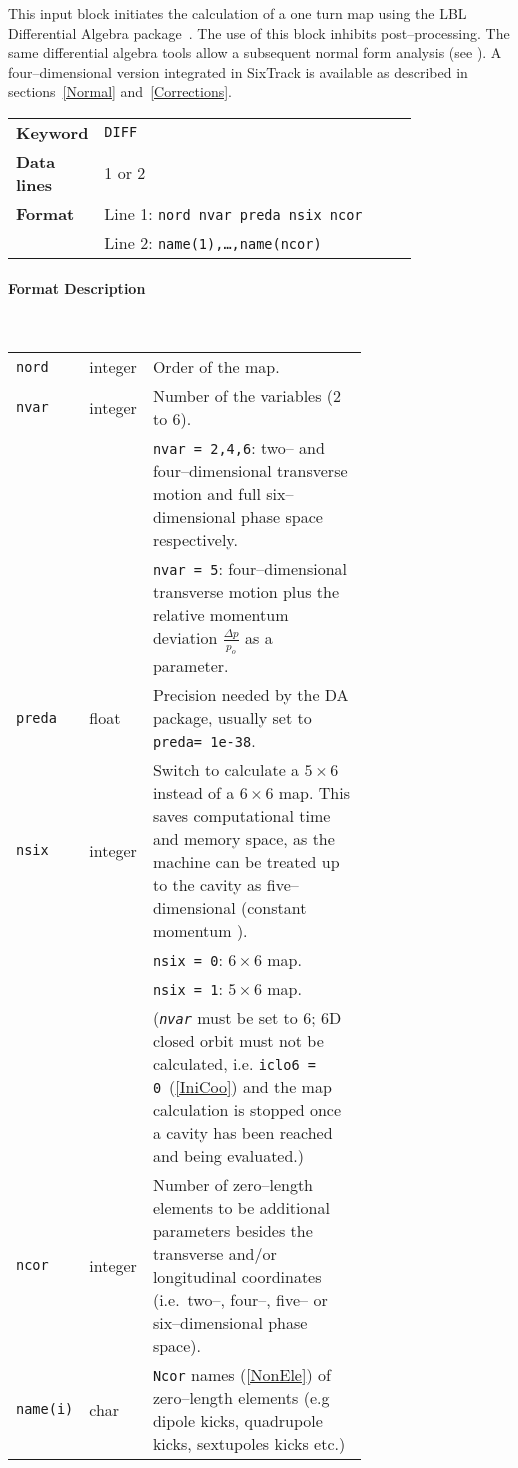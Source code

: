 This input block initiates the calculation of a one turn map using the LBL Differential Algebra package~\cite{DALIE}.
The use of this block inhibits post--processing.
The same differential algebra tools allow a subsequent normal form analysis (see \cite{Forest89}).
A four--dimensional version integrated in SixTrack is available as described in sections~\ref{Normal} and~\ref{Corrections}.

\bigskip
\begin{tabular}{@{}lp{0.8\linewidth}}
    \textbf{Keyword}    & \texttt{DIFF} \\
    \textbf{Data lines} & 1 or 2 \\
    \textbf{Format}     & Line 1: \texttt{nord nvar preda nsix ncor} \\
                        & Line 2: \texttt{name(1),\ldots,name(ncor)}
\end{tabular}

\paragraph{Format Description}~

\bigskip
\begin{longtabu}{@{}llp{0.7\linewidth}}
    \texttt{nord}    & integer & Order of the map. \\
    \texttt{nvar}    & integer & Number of the variables (2 to 6).\\
                     &         & \texttt{nvar = 2,4,6}: two-- and four--dimensional transverse motion and full six--dimensional phase space respectively. \\
                     &         & \texttt{nvar = 5}: four--dimensional transverse motion plus the relative momentum deviation \mbox{$\frac{\Delta p}{p_o}$} as a parameter. \\
    \texttt{preda}   & float   & Precision needed by the DA package, usually set to \mbox{\texttt{preda= 1e-38}}. \\
    \texttt{nsix}    & integer & Switch to calculate a $5 \times 6$ instead of a $6 \times 6$ map. This saves computational time and memory space, as the machine can be treated up to the cavity as five--dimensional (constant momentum ). \\
                     &         & \texttt{nsix = 0}: $6 \times 6$ map. \\
                     &         & \texttt{nsix = 1}: $5 \times 6$ map. \\
                     &         & (\texttt{\em nvar} must be set to 6; 6D closed orbit must not be calculated, i.e. \mbox{\texttt{iclo6 = 0}}~(\ref{IniCoo}) and the map calculation is stopped once a cavity has been reached and being    evaluated.) \\
    \texttt{ncor}    & integer & Number of zero--length elements to be additional parameters besides the transverse and/or longitudinal coordinates (i.e.~two--, four--, five-- or six--dimensional phase space). \\
    \texttt{name(i)} & char    & \texttt{Ncor} names (\ref{NonEle}) of zero--length elements (e.g dipole kicks, quadrupole kicks,   sextupoles kicks etc.)
\end{longtabu}

